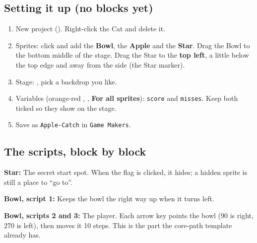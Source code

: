 \documentclass[track=junior,level=2,teacher]{kidscode}
\newenvironment{refscript}[2]{\par\needspace{8\baselineskip}\noindent\textbf{\color{kcaccent}#1:} #2\par\smallskip\begin{center}\begin{scratch}[scale=0.8]}{\end{scratch}\end{center}}
\begin{document}
\subsection{Setting it up (no blocks yet)}
\begin{enumerate}[itemsep=2pt]
  \item New project (). Right-click the Cat and delete it.
  \item Sprites: click  and add the \textbf{Bowl}, the \textbf{Apple} and the
        \textbf{Star}. Drag the Bowl to the bottom middle of the stage. Drag the Star to the
        \textbf{top left}, a little below the top edge and away from the side (the Star marker).
  \item Stage: , pick a backdrop you like.
  \item Variables (orange-red , , \textbf{For all sprites}):
        \texttt{score} and \texttt{misses}. Keep both ticked so they show on the stage.
  \item Save as \texttt{Apple-Catch} in \texttt{Game Makers}.
\end{enumerate}

\subsection{The scripts, block by block}
\begin{refscript}{Star}{The secret start spot. When the flag is clicked, it hides; a hidden sprite is still a place to \enquote{go to}.}
\end{refscript}

\begin{refscript}{Bowl, script 1}{Keeps the bowl the right way up when it turns left.}
\end{refscript}

\begin{refscript}{Bowl, scripts 2 and 3}{The player. Each arrow key points the bowl (90 is right, 270 is left), then moves it 10 steps. This is the part the core-path template already has.}
\end{refscript}
\begin{center}
\begin{scratch}[scale=0.8]
\end{scratch}
\end{center}
\end{document}
